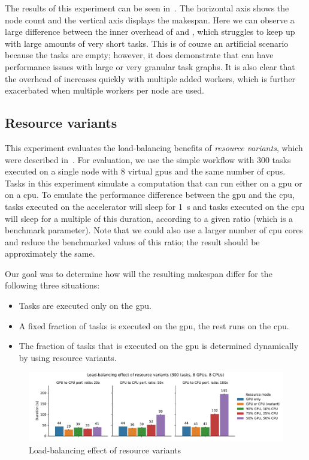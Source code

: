 The results of this experiment can be seen in~. The horizontal axis shows
the node count and the vertical axis displays the makespan. Here we can observe a large difference
between the inner overhead of \hyperqueue{} and \dask{}, which struggles
to keep up with large amounts of very short tasks. This is of course an artificial scenario because
the tasks are empty; however, it does demonstrate that \dask{} can have
performance issues with large or very granular task graphs. It is also clear that the overhead of
\dask{} increases quickly with multiple added workers, which is further exacerbated
when multiple workers per node are used.

\subsection{Resource variants}
\label{sec:hq-exp-resource-variants}
This experiment evaluates the load-balancing benefits of \emph{resource variants}, which were
described in~. For evaluation, we use the simple workflow with
$300$ tasks executed on a single node with $8$ virtual
\glspl{gpu} and the same number of \glspl{cpu}. Tasks in this experiment
simulate a computation that can run either on a \gls{gpu} or on a
\gls{cpu}. To emulate the performance difference between the \gls{gpu}
and the \gls{cpu}, tasks executed on the accelerator will sleep for
\SI{1}{\second} and tasks executed on the \gls{cpu} will sleep for a
multiple of this duration, according to a given ratio (which is a benchmark parameter).
Note that we could also use a larger number of \gls{cpu} cores and reduce the benchmarked values
of this ratio; the result should be approximately the same.

Our goal was to determine how will the resulting makespan differ for the following three
situations:
\begin{itemize}[itemsep=0pt,topsep=2pt]
	\item Tasks are executed only on the \gls{gpu}.
	\item A fixed fraction of tasks is executed on the \gls{gpu}, the rest runs on the
	      \gls{cpu}.
	\item The fraction of tasks that is executed on the \gls{gpu} is determined dynamically by
	      \hyperqueue{} using resource variants.
\end{itemize}

\begin{figure}[h]
	\centering
	\includegraphics[width=\textwidth]{imgs/hq/charts/alternative-resources}
	\caption{Load-balancing effect of resource variants}
	\label{fig:hq-resource-variants}
\end{figure}

